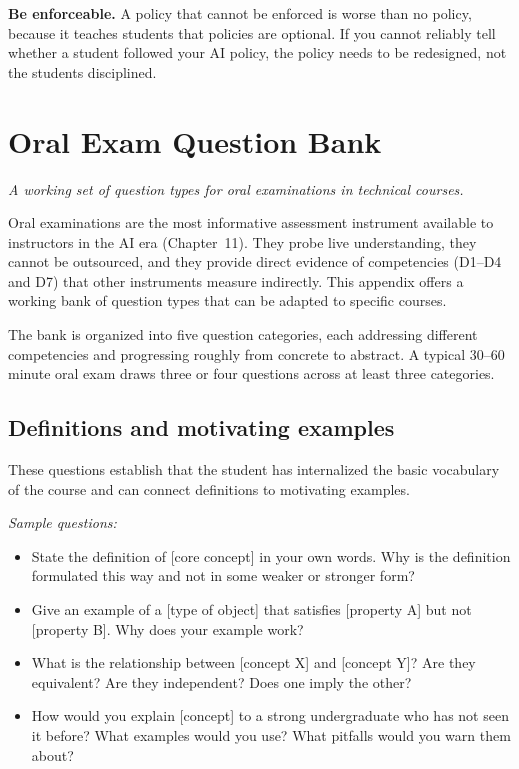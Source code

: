\documentclass[11pt]{book}
\begin{document}
\textbf{Be enforceable.} A policy that cannot be enforced is worse than no policy, because it teaches students that policies are optional. If you cannot reliably tell whether a student followed your AI policy, the policy needs to be redesigned, not the students disciplined.

\chapter{Oral Exam Question Bank}
\label{app:oral-exam-bank}

\noindent \emph{A working set of question types for oral examinations in technical courses.}

\medskip

Oral examinations are the most informative assessment instrument available to instructors in the AI era (Chapter~11). They probe live understanding, they cannot be outsourced, and they provide direct evidence of competencies (D1--D4 and D7) that other instruments measure indirectly. This appendix offers a working bank of question types that can be adapted to specific courses.

The bank is organized into five question categories, each addressing different competencies and progressing roughly from concrete to abstract. A typical 30--60 minute oral exam draws three or four questions across at least three categories.

\section{Definitions and motivating examples}

These questions establish that the student has internalized the basic vocabulary of the course and can connect definitions to motivating examples.

\textit{Sample questions:}

\begin{itemize}\setlength{\itemsep}{2pt}
\item State the definition of [core concept] in your own words. Why is the definition formulated this way and not in some weaker or stronger form?
\item Give an example of a [type of object] that satisfies [property A] but not [property B]. Why does your example work?
\item What is the relationship between [concept X] and [concept Y]? Are they equivalent? Are they independent? Does one imply the other?
\item How would you explain [concept] to a strong undergraduate who has not seen it before? What examples would you use? What pitfalls would you warn them about?
\end{itemize}
\end{document}
